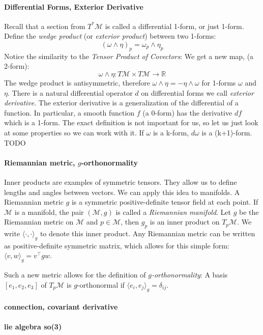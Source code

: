 \documentclass[../thesis.tex]{subfiles}
\begin{document}
\paragraph{Differential Forms, Exterior Derivative}
Recall that a section from $T^*\mathcal{M}$ is called a differential 1-form, or just 1-form.
Define the \emph{wedge product} (or \emph{exterior product}) between two 1-forms:
$$(\omega \wedge \eta)_p = \omega_p \wedge \eta_p$$
Notice the similarity to the \emph{Tensor Product of Covectors}: We get a new map, (a 2-form):
$$\omega \wedge \eta: T\mathcal{M} \times T\mathcal{M} \to \mathbb{R}$$
The wedge product is antisymmetric, therefore $\omega \wedge \eta = -\eta \wedge \omega$ for 1-forms $\omega$ and $\eta$.
There is a natural differential operator $d$ on differential forms we call \emph{exterior derivative}.
The exterior derivative is a generalization of the differential of a function.
In particular, a smooth function $f$ (a 0-form) has the derivative $df$ which is a 1-form.
The exact definition is not important for us, so let us just look at some properties so we can work with it.
If $\omega$ is a k-form, $d\omega$ is a (k+1)-form.
TODO

\paragraph{Riemannian metric, $g$-orthonormality}
Inner products are examples of symmetric tensors. They allow us to define lengths and angles
between vectors. We can apply this idea to manifolds.
A Riemannian metric $g$ is a symmetric positive-definite tensor field at each point.
If $\mathcal{M}$ is a manifold, the pair $(\mathcal{M},g)$ is called a \emph{Riemannian manifold}.
Let $g$ be the Riemannian metric on $\mathcal{M}$ and $p\in \mathcal{M}$,
then $g_p$ is an inner product on $T_p\mathcal{M}$. We write $\langle \cdot, \cdot\rangle_g$ to denote this inner product.
Any Riemannian metric can be written as positive-definite symmetric matrix, which allows for this simple form: $\langle v,w\rangle_g = v^{\top}gw$.

Such a new metric allows for the definition of \emph{$g$-orthonormality}:
A basis $[e_1, e_2, e_3]$ of $T_p\mathcal{M}$ is $g$-orthonormal if $\langle e_i, e_j \rangle_g = \delta_{ij}$.

\paragraph{connection, covariant derivative}
\paragraph{lie algebra so(3)}
\end{document}
